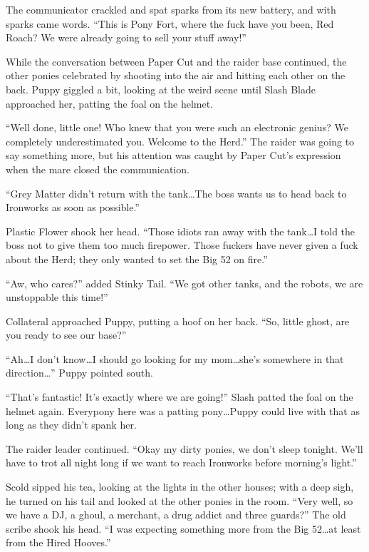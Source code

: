 The communicator crackled and spat sparks from its new battery, and with sparks came words. ``This is Pony Fort, where the fuck have you been, Red Roach? We were already going to sell your stuff away!''

While the conversation between Paper Cut and the raider base continued, the other ponies celebrated by shooting into the air and hitting each other on the back. Puppy giggled a bit, looking at the weird scene until Slash Blade approached her, patting the foal on the helmet.

``Well done, little one! Who knew that you were such an electronic genius? We completely underestimated you. Welcome to the Herd.'' The raider was going to say something more, but his attention was caught by Paper Cut's expression when the mare closed the communication.

``Grey Matter didn't return with the tank\dots The boss wants us to head back to Ironworks as soon as possible.''

Plastic Flower shook her head. ``Those idiots ran away with the tank\dots I told the boss not to give them too much firepower. Those fuckers have never given a fuck about the Herd; they only wanted to set the Big 52 on fire.''

``Aw, who cares?'' added Stinky Tail. ``We got other tanks, and the robots, we are unstoppable this time!''

Collateral approached Puppy, putting a hoof on her back. ``So, little ghost, are you ready to see our base?''

``Ah\dots I don't know\dots I should go looking for my mom\dots she's somewhere in that direction\dots'' Puppy pointed south.

``That's fantastic! It's exactly where we are going!'' Slash patted the foal on the helmet again. Everypony here was a patting pony\dots Puppy could live with that as long as they didn't spank her.

The raider leader continued. ``Okay my dirty ponies, we don't sleep tonight. We'll have to trot all night long if we want to reach Ironworks before morning's light.''

\horizonline


Scold sipped his tea, looking at the lights in the other houses; with a deep sigh, he turned on his tail and looked at the other ponies in the room. ``Very well, so we have a DJ, a ghoul, a merchant, a drug addict and three guards?'' The old scribe shook his head. ``I was expecting something more from the Big 52\dots at least from the Hired Hooves.''

